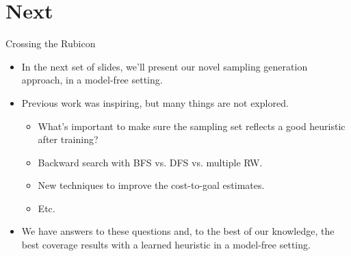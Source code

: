 \documentclass{beamer}
\begin{document}
\section{Next}
\begin{frame}{Crossing the Rubicon}
\begin{itemize}
    \item In the next set of slides, we'll present our novel sampling generation approach, in a model-free setting.
    \item Previous work was inspiring, but many things are not explored.
    \pause
    \begin{itemize}
        \item What's important to make sure the sampling set reflects a good heuristic after training?
        \pause
        \item Backward search with BFS vs. DFS vs. multiple RW.
        \pause
        \item New techniques to improve the cost-to-goal estimates.
        \item Etc.
    \end{itemize}
    \pause
    \item We have answers to these questions and, to the best of our knowledge, the \alert{best coverage results with a learned heuristic in a model-free setting.}
\end{itemize}
\end{frame}

\printbibliography
\end{document}
